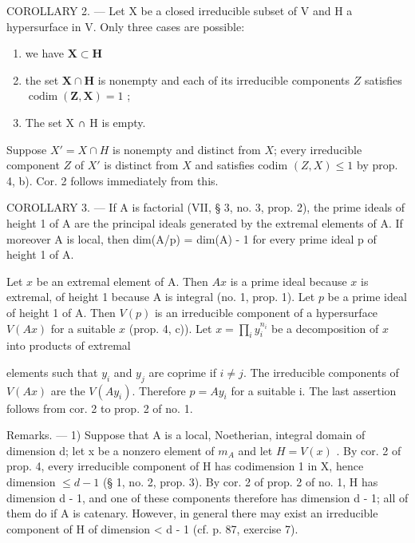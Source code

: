 COROLLARY 2. --- Let X be a closed irreducible subset of V and H a hypersurface in V. Only three cases are possible:

\begin{enumerate}
\def\labelenumi{\arabic{enumi})}
\item
  we have \(\mathbf{X}\subset \mathbf{H}\)
\item
  the set \(\mathbf{X} \cap \mathbf{H}\) is nonempty and each of its irreducible components \(Z\) satisfies \(\operatorname{codim}(\mathbf{Z}, \mathbf{X}) = 1\) ;
\item
  The set X ∩ H is empty.
\end{enumerate}

Suppose \(X' = X \cap H\) is nonempty and distinct from \(X\); every irreducible component \(Z\) of \(X'\) is distinct from \(X\) and satisfies codim \((Z, X) \leqslant 1\) by prop. 4, b). Cor. 2 follows immediately from this.

COROLLARY 3. --- If A is factorial (VII, § 3, no. 3, prop. 2), the prime ideals of height 1 of A are the principal ideals generated by the extremal elements of A. If moreover A is local, then dim(A/p) = dim(A) - 1 for every prime ideal p of height 1 of A.

Let \(x\) be an extremal element of A. Then \(Ax\) is a prime ideal because \(x\) is extremal, of height 1 because A is integral (no. 1, prop. 1). Let \(p\) be a prime ideal of height 1 of A. Then \(V(p)\) is an irreducible component of a hypersurface \(V(Ax)\) for a suitable \(x\) (prop. 4, c)). Let \(x = \prod_{i} y_{i}^{n_i}\) be a decomposition of \(x\) into products of extremal

elements such that \(y_{i}\) and \(y_{j}\) are coprime if \(i \neq j\). The irreducible components of \(V(Ax)\) are the \(V(Ay_{i})\). Therefore \(p = Ay_{i}\) for a suitable i. The last assertion follows from cor. 2 to prop. 2 of no. 1.

Remarks. --- 1) Suppose that A is a local, Noetherian, integral domain of dimension d; let x be a nonzero element of \(m_{A}\) and let \(H = V(x)\) . By cor. 2 of prop. 4, every irreducible component of H has codimension 1 in X, hence dimension \(\leqslant d - 1\) (§ 1, no. 2, prop. 3). By cor. 2 of prop. 2 of no. 1, H has dimension d - 1, and one of these components therefore has dimension d - 1; all of them do if A is catenary. However, in general there may exist an irreducible component of H of dimension \textless{} d - 1 (cf. p. 87, exercise 7).

